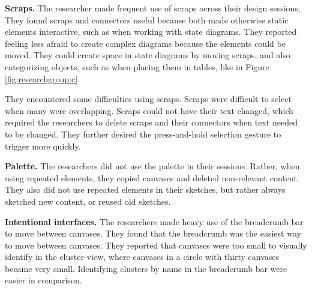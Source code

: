 \textbf{Scraps.} The researcher made frequent use of scraps across their design sessions. They found scraps and connectors useful because both made otherwise static elements interactive, such as when working with state diagrams. They reported feeling less afraid to create complex diagrams because the elements could be moved.  They could create space in state diagrams by moving scraps, and also categorizing objects, such as when placing them in tables, like in Figure \ref{fig:researchgroup:c}. 

They encountered some difficulties using scraps. Scraps were difficult to select when many were overlapping. Scraps could not have their text changed, which required the researchers to delete scraps and their connectors when text needed to be changed. They further desired the press-and-hold selection gesture to trigger more quickly.
%
%
%
%
%
%
%

\textbf{Palette.} The researchers did not use the palette in their sessions. Rather, when using repeated elements, they copied canvases and deleted non-relevant content. They also did not use repeated elements in their sketches, but rather always sketched new content, or reused old sketches.

\textbf{Intentional interfaces.} The researchers made heavy use of the breadcrumb bar to move between canvases. They found that the breadcrumb was the easiest way to move between canvases. They reported that canvases were too small to visually identify in the cluster-view, where canvases in a circle with thirty canvases became very small. Identifying clusters by name in the breadcrumb bar were easier in comparison.

